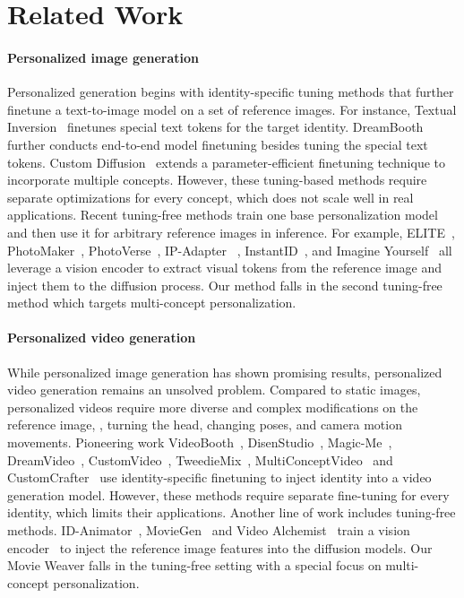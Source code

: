 \section{Related Work}
\label{sec:related_work}

\paragraph{Personalized image generation}
Personalized generation begins with identity-specific tuning methods that further finetune a text-to-image model on a set of reference images. 
For instance, Textual Inversion~\cite{gal2022image} finetunes special text tokens for the target identity. 
DreamBooth~\cite{ruiz2023dreambooth} further conducts end-to-end model finetuning besides tuning the special text tokens.
Custom Diffusion~\cite{kumari2023multi} extends a parameter-efficient finetuning technique to incorporate multiple concepts. 
However, these tuning-based methods require separate optimizations for every concept, which does not scale well in real applications.
Recent tuning-free methods train one base personalization model and then use it for arbitrary reference images in inference.
For example, ELITE~\cite{wei2023elite}, PhotoMaker~\cite{li2023photomaker}, PhotoVerse~\cite{chen2023photoverse}, IP-Adapter~\cite{ye2023ip} , InstantID~\cite{wang2024instantid}, and Imagine Yourself~\cite{dai2023emu,meta24memu} all leverage a vision encoder to extract visual tokens from the reference image and inject them to the diffusion process.
Our method \workname falls in the second tuning-free method which targets multi-concept personalization.


\paragraph{Personalized video generation}
While personalized image generation has shown promising results, personalized video generation remains an unsolved problem.
Compared to static images, personalized videos require more diverse and complex modifications on the reference image, \eg, turning the head, changing poses, and camera motion movements.
Pioneering work VideoBooth~\cite{jiang2024videobooth}, DisenStudio~\cite{chen2024disenstudio}, Magic-Me~\cite{ma2024magic}, DreamVideo~\cite{wei2024dreamvideo}, CustomVideo~\cite{wang2024customvideo}, TweedieMix~\cite{kwon2024tweediemix}, MultiConceptVideo~\cite{kothandaraman2024text} and CustomCrafter~\cite{wu2024customcrafter} use identity-specific finetuning to inject identity into a video generation model. 
However, these methods require separate fine-tuning for every identity, which limits their applications.
Another line of work includes tuning-free methods.
ID-Animator~\cite{he2024id}, MovieGen~\cite{moviegen} and Video Alchemist~\cite{chen2025multi} train a vision encoder~\cite{radford2021learning} to inject the reference image features into the diffusion models.
Our Movie Weaver falls in the tuning-free setting with a special focus on multi-concept personalization.



